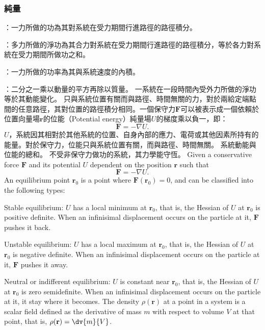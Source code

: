 \documentclass[a4paper,12pt]{article}
\begin{document}
\subsubsection{純量}
\bit
\item{}：一力所做的功為其對系統在受力期間行進路徑的路徑積分。
\item{}：多力所做的淨功為其合力對系統在受力期間行進路徑的路徑積分，等於各力對系統在受力期間所做功之和。
\item{}：一力所做的功率為其與系統速度的內積。
\item{}：二分之一乘以動量的平方再除以質量。
\ei
{}
一系統在一段時間內受外力所做的淨功等於其動能變化。
只與系統位置有關而與路徑、時間無關的力，對於兩給定端點間的任意路徑，其對位置的路徑積分相同。一個保守力$\mathbf{F}$可以被表示成一個依賴於位置向量場$\mathbf{r}$的位能（Potential energy）純量場$U$的梯度乘以負一，即：
\[\mathbf{F}=-\nabla U.\]
$U$，系統因其相對於其他系統的位置、自身內部的應力、電荷或其他因素所持有的能量。對於保守力，位能只與系統位置有關，而與路徑、時間無關。
系統動能與位能的總和。
不受非保守力做功的系統，其力學能守恆。
Given a conservative force $\mathbf{F}$ and its potential $U$ dependent on the position $\mathbf{r}$ such that
\[\mathbf{F}=-\nabla U.\]
An equilibrium point $\mathbf{r}_0$ is a point where $\mathbf{F}(\mathbf{r}_0)=0$, and can be classified into the following types:
\bit
\item Stable equilibrium: $U$ has a local minimum at $\mathbf{r}_0$, that is, the Hessian of $U$ at $\mathbf{r}_0$ is positive definite. When an infinisimal displacement occurs on the particle at it, $\mathbf{F}$ pushes it back.
\item Unstable equilibrium: $U$ has a local maximum at $\mathbf{r}_0$, that is, the Hessian of $U$ at $\mathbf{r}_0$ is negative definite. When an infinisimal displacement occurs on the particle at it, $\mathbf{F}$ pushes it away.
\item Neutral or indifferent equilibrium: $U$ is constant near $\mathbf{r}_0$, that is, the Hessian of $U$ at $\mathbf{r}_0$ is zero semidefinite. When an infinisimal displacement occurs on the particle at it, it stay where it becomes.
\eit
{}
The density $\rho(\mathbf{r})$ at a point in a system is a scalar field defined as the derivative of mass $m$ with respect to volume $V$ at that point, that is, $\rho(\mathbf{r})=\dv{m}{V}$.
\end{document}
